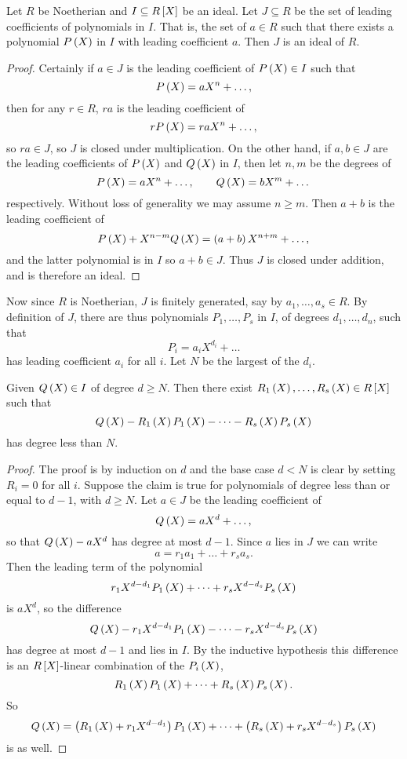 \begin{lemma}
Let $ R $ be Noetherian and $ I \subseteq R\sb{X} $ be an ideal. Let $ J \subseteq R $ be the set of leading coefficients of polynomials in $ I $. That is, the set of $ a \in R $ such that there exists a polynomial $ P\rb{X} $ in $ I $ with leading coefficient $ a $. Then $ J $ is an ideal of $ R $.
\end{lemma}

\begin{proof}
Certainly if $ a \in J $ is the leading coefficient of $ P\rb{X} \in I $ such that
$$ P\rb{X} = aX^n + \dots, $$
then for any $ r \in R $, $ ra $ is the leading coefficient of
$$ rP\rb{X} = raX^n + \dots, $$
so $ ra \in J $, so $ J $ is closed under multiplication. On the other hand, if $ a, b \in J $ are the leading coefficients of $ P\rb{X} $ and $ Q\rb{X} $ in $ I $, then let $ n, m $ be the degrees of
$$ P\rb{X} = aX^n + \dots, \qquad Q\rb{X} = bX^m + \dots $$
respectively. Without loss of generality we may assume $ n \ge m $. Then $ a + b $ is the leading coefficient of
$$ P\rb{X} + X^{n - m}Q\rb{X} = \rb{a + b}X^{n + m} + \dots, $$
and the latter polynomial is in $ I $ so $ a + b \in J $. Thus $ J $ is closed under addition, and is therefore an ideal.
\end{proof}

Now since $ R $ is Noetherian, $ J $ is finitely generated, say by $ a_1, \dots, a_s \in R $. By definition of $ J $, there are thus polynomials $ P_1, \dots, P_s $ in $ I $, of degrees $ d_1, \dots, d_n $, such that
$$ P_i = a_iX^{d_i} + \dots $$
has leading coefficient $ a_i $ for all $ i $. Let $ N $ be the largest of the $ d_i $.

\begin{lemma}
Given $ Q\rb{X} \in I $ of degree $ d \ge N $. Then there exist $ R_1\rb{X}, \dots, R_s\rb{X} \in R\sb{X} $ such that
$$ Q\rb{X} - R_1\rb{X}P_1\rb{X} - \dots - R_s\rb{X}P_s\rb{X} $$
has degree less than $ N $.
\end{lemma}

\begin{proof}
The proof is by induction on $ d $ and the base case $ d < N $ is clear by setting $ R_i = 0 $ for all $ i $. Suppose the claim is true for polynomials of degree less than or equal to $ d - 1 $, with $ d \ge N $. Let $ a \in J $ be the leading coefficient of
$$ Q\rb{X} = aX^d + \dots, $$
so that $ Q\rb{X} - aX^d $ has degree at most $ d - 1 $. Since $ a $ lies in $ J $ we can write
$$ a = r_1a_1 + \dots + r_sa_s. $$
Then the leading term of the polynomial
$$ r_1X^{d - d_1}P_1\rb{X} + \dots + r_sX^{d - d_s}P_s\rb{X} $$
is $ aX^d $, so the difference
$$ Q\rb{X} - r_1X^{d - d_1}P_1\rb{X} - \dots - r_sX^{d - d_s}P_s\rb{X} $$
has degree at most $ d - 1 $ and lies in $ I $. By the inductive hypothesis this difference is an $ R\sb{X} $-linear combination of the $ P_i\rb{X} $,
$$ R_1\rb{X}P_1\rb{X} + \dots + R_s\rb{X}P_s\rb{X}. $$
So
$$ Q\rb{X} = \rb{R_1\rb{X} + r_1X^{d - d_1}}P_1\rb{X} + \dots + \rb{R_s\rb{X} + r_sX^{d - d_s}}P_s\rb{X} $$
is as well.
\end{proof}

